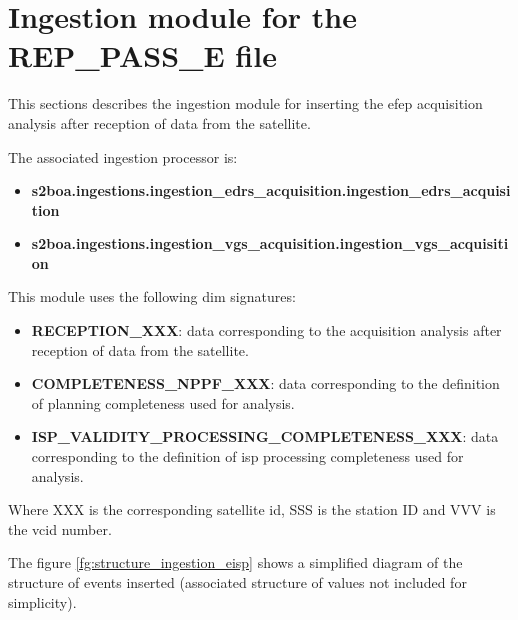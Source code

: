 \section{Ingestion module for the REP\_PASS\_E file}

This sections describes the ingestion module for inserting the \acrshort{efep} acquisition analysis after reception of data from the satellite.

The associated ingestion processor is:

\begin{itemize} 

\item \textbf{s2boa.ingestions.ingestion\_edrs\_acquisition.ingestion\_edrs\_acquisition}

\item \textbf{s2boa.ingestions.ingestion\_vgs\_acquisition.ingestion\_vgs\_acquisition}
  
\end{itemize}

This module uses the following \acrshort{dim} signatures:

\begin{itemize} 

\item \textbf{RECEPTION\_XXX}: data corresponding to the acquisition analysis after reception of data from the satellite.

\item \textbf{COMPLETENESS\_NPPF\_XXX}: data corresponding to the definition of planning completeness used for analysis.

\item \textbf{ISP\_VALIDITY\_PROCESSING\_COMPLETENESS\_XXX}: data corresponding to the definition of \acrshort{isp} processing completeness used for analysis.

\end{itemize}

Where XXX is the corresponding satellite id, SSS is the station ID and VVV is the \acrshort{vcid} number.

The figure \ref{fg:structure_ingestion_eisp} shows a simplified diagram of the structure of events inserted (associated structure of values not included for simplicity).

